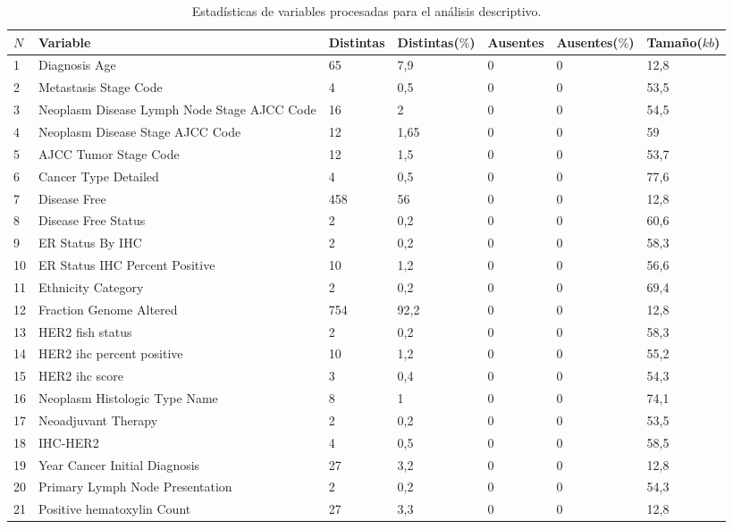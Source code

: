 \begin{table}[hbt!]
	\footnotesize
	\centering
	\begin{threeparttable}
		\caption{Estadísticas de variables procesadas para el análisis descriptivo.}
		\label{data_limpia}
		\begin{tabular}{p{0.5cm} p{4cm} p{1.5cm} p{2cm} p{1.5cm} p{2cm} p{1.5cm}} \toprule
			$N$  &Variable &Distintas &Distintas($\%$) &Ausentes &Ausentes($\%$)  &Tamaño($kb$)
			\\ \hline	1	&	Diagnosis Age	&	65	&	7,9	&	0	&	0	&	12,8
			\\ \hline	2	&	Metastasis Stage Code	&	4	&	0,5	&	0	&	0	&	53,5
			\\ \hline	3	&	Neoplasm Disease Lymph Node Stage AJCC Code	&	16	&	2	&	0	&	0	&	54,5
			\\ \hline	4	&	Neoplasm Disease Stage AJCC Code	&	12	&	1,65	&	0	&	0	&	59
			\\ \hline	5	&	AJCC Tumor Stage Code	&	12	&	1,5	&	0	&	0	&	53,7
			\\ \hline	6	&	Cancer Type Detailed	&	4	&	0,5	&	0	&	0	&	77,6
			\\ \hline	7	&	Disease Free 	&	458	&	56	&	0	&	0	&	12,8
			\\ \hline	8	&	Disease Free Status	&	2	&	0,2	&	0	&	0	&	60,6
			\\ \hline	9	&	ER Status By IHC	&	2	&	0,2	&	0	&	0	&	58,3
			\\ \hline	10	&	ER Status IHC Percent Positive	&	10	&	1,2	&	0	&	0	&	56,6
			\\ \hline	11	&	Ethnicity Category	&	2	&	0,2	&	0	&	0	&	69,4
			\\ \hline	12	&	Fraction Genome Altered	&	754	&	92,2	&	0	&	0	&	12,8
			\\ \hline	13	&	HER2 fish status	&	2	&	0,2	&	0	&	0	&	58,3
			\\ \hline	14	&	HER2 ihc percent positive	&	10	&	1,2	&	0	&	0	&	55,2
			\\ \hline	15	&	HER2 ihc score	&	3	&	0,4	&	0	&	0	&	54,3
			\\ \hline	16	&	Neoplasm Histologic Type Name	&	8	&	1	&	0	&	0	&	74,1
			\\ \hline	17	&	Neoadjuvant Therapy 	&	2	&	0,2	&	0	&	0	&	53,5
			\\ \hline	18	&	IHC-HER2	&	4	&	0,5	&	0	&	0	&	58,5
			\\ \hline	19	&	Year Cancer Initial Diagnosis	&	27	&	3,2	&	0	&	0	&	12,8
			\\ \hline	20	&	Primary Lymph Node Presentation 	&	2	&	0,2	&	0	&	0	&	54,3
			\\ \hline	21	&	Positive hematoxylin Count	&	27	&	3,3	&	0	&	0	&	12,8

\end{tabular}
\end{threeparttable}
\end{table}
